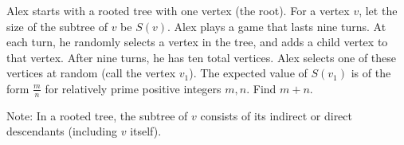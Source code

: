 Alex starts with a rooted tree with one vertex (the root). For a vertex $v$, let the size of the subtree of $v$ be $S(v)$. Alex plays a game that lasts nine turns. At each turn, he randomly selects a vertex in the tree, and adds a child vertex to that vertex. After nine turns, he has ten total vertices. Alex selects one of these vertices at random (call the vertex $v_1$). The expected value of $S(v_1)$ is of the form $\frac{m}{n}$ for relatively prime positive integers $m, n$. Find $m+n$.

Note: In a rooted tree, the subtree of $v$ consists of its indirect or direct descendants (including $v$ itself).
